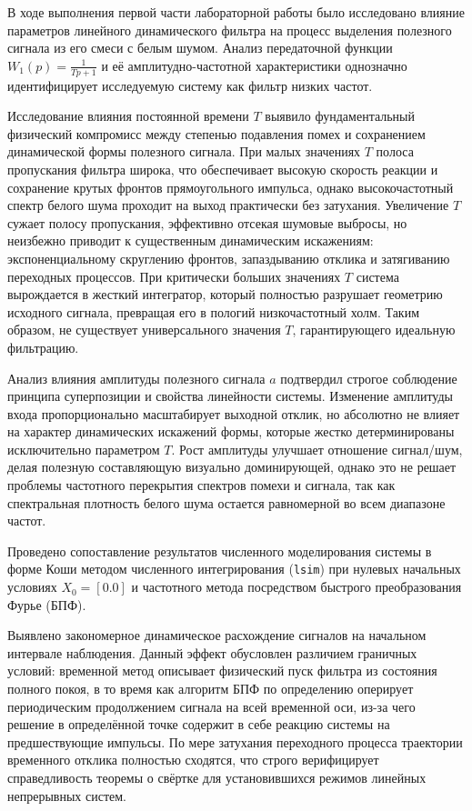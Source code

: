 В ходе выполнения первой части лабораторной работы было исследовано влияние параметров линейного динамического фильтра на процесс выделения полезного сигнала из его смеси с белым шумом. Анализ передаточной функции $W_1(p) = \frac{1}{Tp + 1}$ и её амплитудно-частотной характеристики однозначно идентифицирует исследуемую систему как фильтр низких частот.

Исследование влияния постоянной времени $T$ выявило фундаментальный физический компромисс между степенью подавления помех и сохранением динамической формы полезного сигнала. При малых значениях $T$ полоса пропускания фильтра широка, что обеспечивает высокую скорость реакции и сохранение крутых фронтов прямоугольного импульса, однако высокочастотный спектр белого шума проходит на выход практически без затухания. Увеличение $T$ сужает полосу пропускания, эффективно отсекая шумовые выбросы, но неизбежно приводит к существенным динамическим искажениям: экспоненциальному скруглению фронтов, запаздыванию отклика и затягиванию переходных процессов. При критически больших значениях $T$ система вырождается в жесткий интегратор, который полностью разрушает геометрию исходного сигнала, превращая его в пологий низкочастотный холм. Таким образом, не существует универсального значения $T$, гарантирующего идеальную фильтрацию.

Анализ влияния амплитуды полезного сигнала $a$ подтвердил строгое соблюдение принципа суперпозиции и свойства линейности системы. Изменение амплитуды входа пропорционально масштабирует выходной отклик, но абсолютно не влияет на характер динамических искажений формы, которые жестко детерминированы исключительно параметром $T$. Рост амплитуды улучшает отношение сигнал/шум, делая полезную составляющую визуально доминирующей, однако это не решает проблемы частотного перекрытия спектров помехи и сигнала, так как спектральная плотность белого шума остается равномерной во всем диапазоне частот.

Проведено сопоставление результатов численного моделирования системы в форме Коши методом численного интегрирования (\texttt{lsim}) при нулевых начальных условиях $X_0 = [0.0]$ и частотного метода посредством быстрого преобразования Фурье (БПФ).

Выявлено закономерное динамическое расхождение сигналов на начальном интервале наблюдения. Данный эффект обусловлен различием граничных условий: временной метод описывает физический пуск фильтра из состояния полного покоя, в то время как алгоритм БПФ по определению оперирует периодическим продолжением сигнала на всей временной оси, из-за чего решение в определённой точке содержит в себе реакцию системы на предшествующие импульсы. По мере затухания переходного процесса траектории временного отклика полностью сходятся, что строго верифицирует справедливость теоремы о свёртке для установившихся режимов линейных непрерывных систем.